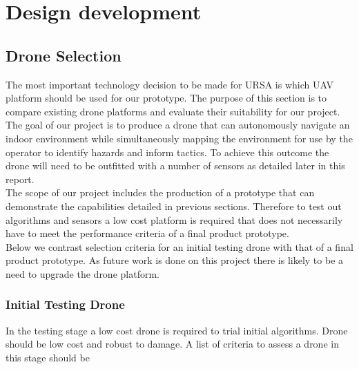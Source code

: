 \documentclass[capstone_report.tex]{subfiles}
\begin{document}
\chapter{Design development}

\section{Drone Selection}
The most important technology decision to be made for URSA is which UAV platform should be used for our prototype. The purpose of this section is to compare existing drone platforms and evaluate their suitability for our project.\\

The goal of our project is to produce a drone that can autonomously navigate an indoor environment while simultaneously mapping the environment for use by the operator to identify hazards and inform tactics.  To achieve this outcome the drone will need to be outfitted with a number of sensors as detailed later in this report.\\

The scope of our project includes the production of a prototype that can demonstrate the capabilities detailed in previous sections.  Therefore to test out algorithms and sensors a low cost platform is required that does not necessarily have to meet the performance criteria of a final product prototype.\\

Below we contrast selection criteria for an initial testing drone with that of a final product prototype.  As future work is done on this project there is likely to be a need to upgrade the drone platform.

\subsection{Initial Testing Drone}
In the testing stage a low cost drone is required to trial initial algorithms.  Drone should be low cost and robust to damage.  A list of criteria to assess a drone in this stage should be
\end{document}
